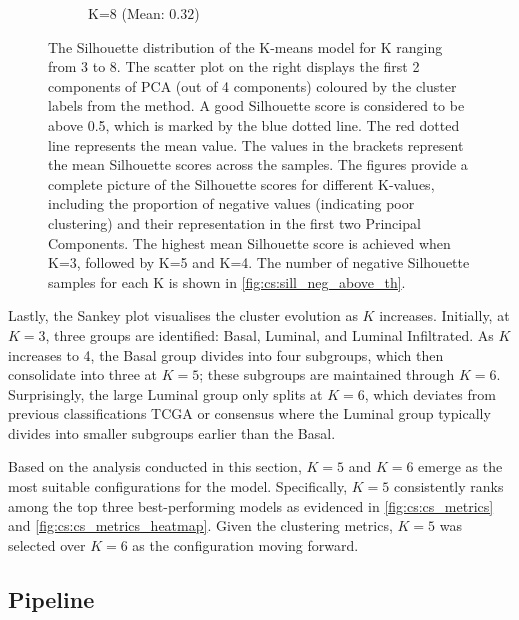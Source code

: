 \begin{figure}[!t]
\begin{subfigure}[!t]{0.49\textwidth}
        \caption{K=8 (Mean: $0.32$)}
    \end{subfigure}
    \centering
    \caption[Silhouette distribution a further exploration of K-means]{The Silhouette distribution of the K-means model for K ranging from 3 to 8. The scatter plot on the right displays the first 2 components of PCA (out of 4 components) coloured by the cluster labels from the method. A good Silhouette score is considered to be above 0.5, which is marked by the blue dotted line. The red dotted line represents the mean value. The values in the brackets represent the mean Silhouette scores across the samples. The figures provide a complete picture of the Silhouette scores for different K-values, including the proportion of negative values (indicating poor clustering) and their representation in the first two Principal Components. The highest mean Silhouette score is achieved when K=3, followed by K=5 and K=4. The number of negative Silhouette samples for each K is shown in \cref{fig:cs:sill_neg_above_th}.}
    \label{fig:cs:sill_distrib}
\end{figure}

Lastly, the Sankey plot visualises the cluster evolution as $K$ increases. Initially, at $K=3$, three groups are identified: Basal, Luminal, and Luminal Infiltrated. As $K$ increases to 4, the Basal group divides into four subgroups, which then consolidate into three at $K=5$; these subgroups are maintained through $K=6$. Surprisingly, the large Luminal group only splits at $K=6$, which deviates from previous classifications TCGA or consensus \citep{Robertson2017-mg, Kamoun2020-tj} where the Luminal group typically divides into smaller subgroups earlier than the Basal.

Based on the analysis conducted in this section, $K=5$ and $K=6$ emerge as the most suitable configurations for the model. Specifically, $K=5$ consistently ranks among the top three best-performing models as evidenced in \cref{fig:cs:cs_metrics} and \cref{fig:cs:cs_metrics_heatmap}. Given the clustering metrics, $K=5$ was selected over $K=6$ as the configuration moving forward.





\subsection{Pipeline}

